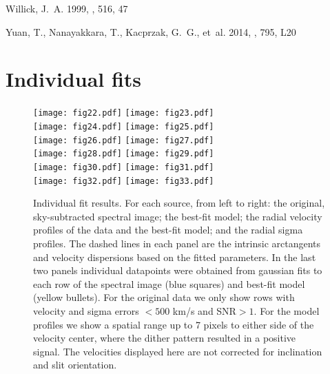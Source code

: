 \documentclass{emulateapj}
\begin{document}
{\begin{thebibliography}{}
{Willick}, J.~A. 1999, \apj, 516, 47

{Yuan}, T., {Nanayakkara}, T., {Kacprzak}, G.~G., {et~al.} 2014, \apjl, 795,
  L20

\end{thebibliography}

	
\appendix
\section{Individual fits}
\label{app:collage}

\begin{figure*}
\begin{center}
\texttt{[image: fig22.pdf]}
\texttt{[image: fig23.pdf]}\\
\texttt{[image: fig24.pdf]}
\texttt{[image: fig25.pdf]}\\
\texttt{[image: fig26.pdf]}
\texttt{[image: fig27.pdf]}\\
\texttt{[image: fig28.pdf]}
\texttt{[image: fig29.pdf]}\\
\texttt{[image: fig30.pdf]}
\texttt{[image: fig31.pdf]}\\
\texttt{[image: fig32.pdf]}
\texttt{[image: fig33.pdf]}\\
\caption{{Individual fit results. For each source, from left to right: the original, sky-subtracted spectral image; the best-fit model; the radial velocity profiles of the data and the best-fit model; and the radial sigma profiles. The dashed lines in each panel are the intrinsic arctangents and velocity dispersions based on the fitted parameters. In the last two panels individual datapoints were obtained from gaussian fits to each row of the spectral image (blue squares) and best-fit model (yellow bullets). For the original data we only show rows with velocity and sigma errors $<500$ km/s and SNR$>1$. For the model profiles we show a spatial range up to 7 pixels to either side of the velocity center, where the dither pattern resulted in a positive signal. The velocities displayed here are not corrected for inclination and slit orientation.}} 
\label{fig:collage1}
\end{center}
\end{figure*}

}
\end{document}
